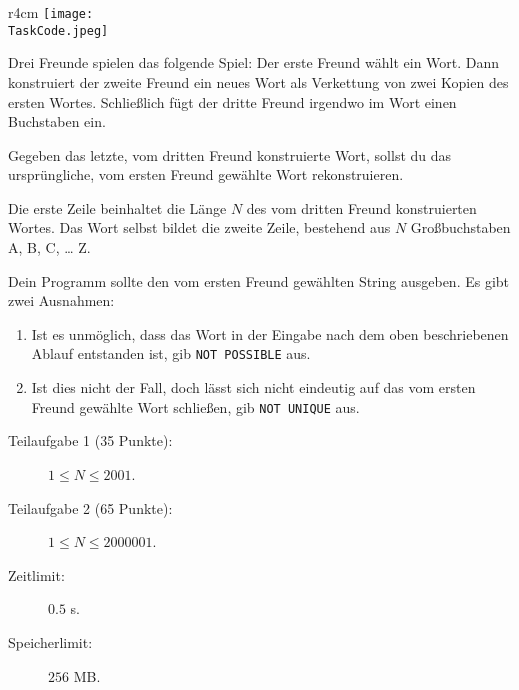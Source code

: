 \documentclass{boi2014-de}
\renewcommand{\TaskCode}{friends}
\begin{document}
    \begin{wrapfigure}{r}{4cm}
        \vspace{-24pt}
		\texttt{[image: \\TaskCode.jpeg]}
	\end{wrapfigure}
    Drei Freunde spielen das folgende Spiel:
    Der erste Freund wählt ein Wort.
    Dann konstruiert der zweite Freund ein neues Wort als Verkettung von zwei Kopien des ersten Wortes.
    Schließlich fügt der dritte Freund irgendwo im Wort einen Buchstaben ein.

    \Task
    Gegeben das letzte, vom dritten Freund konstruierte Wort, sollst du das ursprüngliche, vom ersten Freund gewählte Wort rekonstruieren.

    \Input
    Die erste Zeile beinhaltet die Länge $N$ des vom dritten Freund konstruierten Wortes.
    Das Wort selbst bildet die zweite Zeile, bestehend aus $N$ Großbuchstaben A, B, C, \ldots{} Z.

    \Output
    Dein Programm sollte den vom ersten Freund gewählten String ausgeben.
    Es gibt zwei Ausnahmen:
    \begin{enumerate}
        \item Ist es unmöglich, dass das Wort in der Eingabe nach dem oben beschriebenen Ablauf entstanden ist, gib {\tt NOT POSSIBLE} aus.
        \item Ist dies nicht der Fall, doch lässt sich nicht eindeutig auf das vom ersten Freund gewählte Wort schließen, gib {\tt NOT
        UNIQUE} aus.
    \end{enumerate}
    

    \Examples


    \Scoring

    \begin{description}
        \item[Teilaufgabe 1 (35 Punkte):] $1 \le N \le 2001$.
        \item[Teilaufgabe 2 (65 Punkte):] $1 \le N \le 2000001$.
    \end{description}

    \Constraints

    \begin{description}
        \item[Zeitlimit:] $0.5$ s.
        \item[Speicherlimit:] $256$ MB.
    \end{description}
\end{document}
